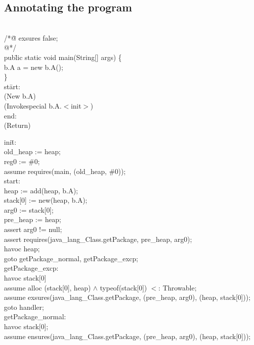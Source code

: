 \subsection{Annotating the program}



\bcode
 \\
  /*\=@ exsures false;\+\\
    @*/\-\\
  pub\=lic static void main(String[] args) \{\+\\
    b.A a = new b.A();\-\\
  \}\\
\ecode
\bcode
st\=art:\+\\
    (New b.A) \\
    (Invokespecial b.A.$<$init$>$)\\
\< end:\\
    (Return)
\ecode


\bcode
ini\=t:\+\\
    old\_heap := heap;\\
    reg0 := \#0;\\
    assume requires(main, (old\_heap, \#0));\\
\<start:\\
    heap := add(heap, b.A);\\
    stack[0] := new(heap, b.A);\\
    arg0 := stack[0];\\
    pre\_heap := heap;\\
    assert arg0 != null;\\
    assert requires(java\_lang\_Class.getPackage, pre\_heap, arg0);\\
    havoc heap;\\
    goto getPackage\_normal, getPackage\_excp;\\
\< getPackage\_excp:\\
    havoc stack[0]\\
    assume alloc (stack[0], heap) $\wedge$ typeof(stack[0]) $<$: Throwable;\\
    assume exsures(java\_lang\_Class.getPackage, (pre\_heap, arg0), (heap, stack[0]));\\
    goto handler;\\
\< getPackage\_normal:\\
    havoc stack[0];\\
    assume ensures(java\_lang\_Class.getPackage, (pre\_heap, arg0), (heap, stack[0]));\\

\ecode